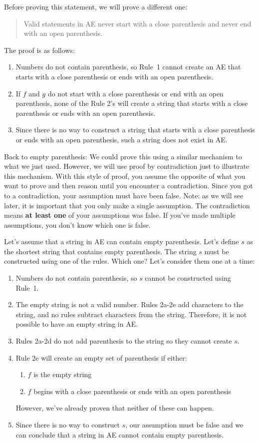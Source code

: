 \documentclass[letterpaper,12pt,openany,reqno]{book}%
\begin{document}
Before proving this statement, we will prove a different one:
\begin{quote}
Valid statements in AE never start with a close parenthesis and never end with an open parenthesis.
\end{quote}
The proof is as follows:
\begin{enumerate}
\item Numbers do not contain parenthesis, so Rule~1 cannot create an AE that starts with a close parenthesis or ends with an open parenthesis.
\item If $f$ and $g$ do not start with a close parenthesis or end with an open parenthesis, none of the Rule 2's will create a string that starts with a close parenthesis or ends with an open parenthesis.
\item Since there is no way to construct a string that starts with a close parenthesis or ends with an open parenthesis, such a string does not exist in AE.
\end{enumerate}

Back to empty parenthesis: We could prove this using a similar mechanism to what we just used. However, we will use proof by contradiction just to illustrate this mechanism. With this style of proof, you assume the opposite of what you want to prove and then reason until you encounter a contradiction. Since you got to a contradiction, your assumption must have been false. Note: as we will see later, it is important that you only make a single assumption. The contradiction means \textbf{at least one} of your assumptions was false. If you've made multiple assumptions, you don't know which one is false.

Let's assume that a string in AE can contain empty parenthesis. Let's define $s$ as the shortest string that contains empty parenthesis. The string $s$ must be constructed using one of the rules. Which one? Let's consider them one at a time:
\begin{enumerate}
\item Numbers do not contain parenthesis, so $s$ cannot be constructed using Rule~1.
\item The empty string is not a valid number. Rules 2a-2e add characters to the string, and no rules subtract characters from the string. Therefore, it is not possible to have an empty string in AE.
\item Rules 2a-2d do not add parenthesis to the string so they cannot create $s$.
\item Rule 2e will create an empty set of parenthesis if either:
\begin{enumerate}
\item $f$ is the empty string 
\item $f$ begins with a close parenthesis or ends with an open parenthesis
\end{enumerate}
However, we've already proven that neither of these can happen.
\item Since there is no way to construct $s$, our assumption must be false and we can conclude that a string in AE cannot contain empty parenthesis.
\end{enumerate}
\end{document}
